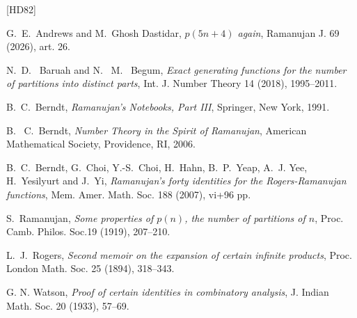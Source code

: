 \documentclass[12pt]{amsart}
\theoremstyle{definition}
\numberwithin{equation}{section}
\begin{document}
\begin{thebibliography}{[HD82]}

  

\normalsize


 G.~E.~Andrews and M.~Ghosh Dastidar, \emph{$p(5n+4)$ again}, Ramanujan J. 69 (2026), art. 26.

 N.~D.~ Baruah and N.~ M.~ Begum, \emph{Exact generating functions for the number of partitions into distinct parts}, Int. J. Number Theory 14 (2018), 1995--2011.


 B.~C.~Berndt, \emph{Ramanujan's Notebooks, Part III}, Springer, New York, 1991.

 B.~ C.~Berndt, \emph{Number Theory in the Spirit of Ramanujan}, American Mathematical
Society, Providence, RI, 2006.

B.~C.~Berndt, G.~Choi, Y.-S.~Choi, H.~Hahn, B.~P.~Yeap, A.~J. Yee, H.~Yesilyurt and J.~Yi, \emph{Ramanujan's forty identities for the Rogers-Ramanujan functions}, Mem. Amer. Math. Soc. 188 (2007), vi+96 pp.

  S.~Ramanujan, \emph{Some properties of $p(n)$, the number of partitions of $n$}, Proc. Camb. Philos. Soc.19 (1919), 207--210.

  L.~J.~Rogers,  \emph{Second memoir on the expansion of certain infinite products}, Proc. London Math. Soc. 25 (1894), 318--343. 

 G. N. Watson,  \emph{Proof of certain identities in combinatory analysis}, J. Indian Math. Soc. 20 (1933), 57--69.
\end{thebibliography}
\end{document}
